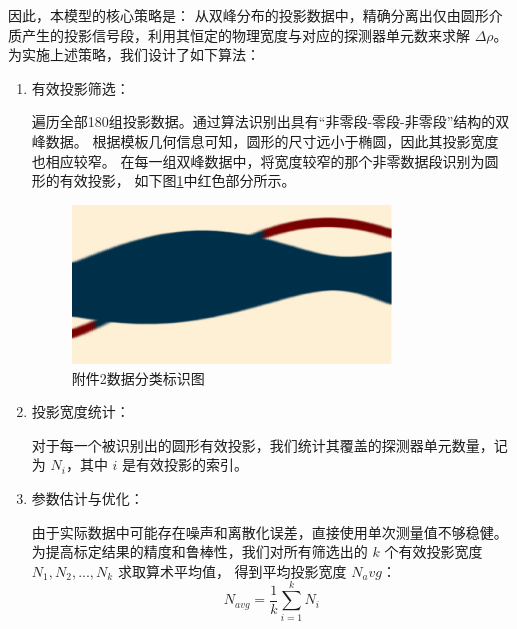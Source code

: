 因此，本模型的核心策略是：
从双峰分布的投影数据中，精确分离出仅由圆形介质产生的投影信号段，利用其恒定的物理宽度与对应的探测器单元数来求解 $\Delta\rho$。
为实施上述策略，我们设计了如下算法：\par
\begin{enumerate}[label=(\arabic*), left=0.5em]
\item 有效投影筛选：\par
遍历全部180组投影数据。通过算法识别出具有“非零段-零段-非零段”结构的双峰数据。
根据模板几何信息可知，圆形的尺寸远小于椭圆，因此其投影宽度也相应较窄。
在每一组双峰数据中，将宽度较窄的那个非零数据段识别为圆形的有效投影，
如下图\ref{fig:category}中红色部分所示。

\begin{figure}[h] 
    \centering 
    \includegraphics[width=0.8\textwidth]{圆形投影分离.png} 
    \caption{附件2数据分类标识图} 
    \label{fig:category}
\end{figure}


\item 投影宽度统计：\par
对于每一个被识别出的圆形有效投影，我们统计其覆盖的探测器单元数量，记为 $N_i$，其中 $i$ 是有效投影的索引。

\item 参数估计与优化：\par
由于实际数据中可能存在噪声和离散化误差，直接使用单次测量值不够稳健。
为提高标定结果的精度和鲁棒性，我们对所有筛选出的 $k$ 个有效投影宽度 $N_1, N_2, ..., N_k$ 求取算术平均值，
得到平均投影宽度 $N_avg$：
$$N_{avg} = \frac{1}{k} \sum_{i=1}^{k} N_i$$
\end{enumerate}